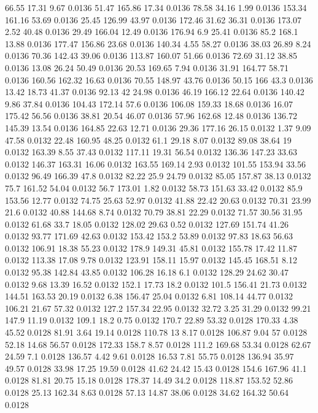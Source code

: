 66.55	17.31	9.67	0.0136
51.47	165.86	17.34	0.0136
78.58	34.16	1.99	0.0136
153.34	161.16	53.69	0.0136
25.45	126.99	43.97	0.0136
172.46	31.62	36.31	0.0136
173.07	2.52	40.48	0.0136
29.49	166.04	12.49	0.0136
176.94	6.9	25.41	0.0136
85.2	168.1	13.88	0.0136
177.47	156.86	23.68	0.0136
140.34	4.55	58.27	0.0136
38.03	26.89	8.24	0.0136
70.36	142.43	39.06	0.0136
113.87	160.07	51.66	0.0136
72.69	31.12	38.85	0.0136
13.08	26.24	50.49	0.0136
20.53	169.65	7.94	0.0136
31.91	164.77	58.71	0.0136
160.56	162.32	16.63	0.0136
70.55	148.97	43.76	0.0136
50.15	166	43.3	0.0136
13.42	18.73	41.37	0.0136
92.13	42	24.98	0.0136
46.19	166.12	22.64	0.0136
140.42	9.86	37.84	0.0136
104.43	172.14	57.6	0.0136
106.08	159.33	18.68	0.0136
16.07	175.42	56.56	0.0136
38.81	20.54	46.07	0.0136
57.96	162.68	12.48	0.0136
136.72	145.39	13.54	0.0136
164.85	22.63	12.71	0.0136
29.36	177.16	26.15	0.0132
1.37	9.09	47.58	0.0132
22.48	160.95	48.25	0.0132
61.1	29.18	8.07	0.0132
89.08	38.64	19	0.0132
163.39	8.55	37.43	0.0132
117.11	19.31	56.54	0.0132
136.36	147.23	33.63	0.0132
146.37	163.31	16.06	0.0132
163.55	169.14	2.93	0.0132
101.55	153.94	33.56	0.0132
96.49	166.39	47.8	0.0132
82.22	25.9	24.79	0.0132
85.05	157.87	38.13	0.0132
75.7	161.52	54.04	0.0132
56.7	173.01	1.82	0.0132
58.73	151.63	33.42	0.0132
85.9	153.56	12.77	0.0132
74.75	25.63	52.97	0.0132
41.88	22.42	20.63	0.0132
70.31	23.99	21.6	0.0132
40.88	144.68	8.74	0.0132
70.79	38.81	22.29	0.0132
71.57	30.56	31.95	0.0132
61.68	33.7	18.05	0.0132
128.02	29.63	0.52	0.0132
127.69	151.74	41.26	0.0132
93.77	171.69	42.63	0.0132
153.42	153.2	53.89	0.0132
97.83	18.63	56.63	0.0132
106.91	18.38	55.23	0.0132
178.9	149.31	45.81	0.0132
155.78	17.42	11.87	0.0132
113.38	17.08	9.78	0.0132
123.91	158.11	15.97	0.0132
145.45	168.51	8.12	0.0132
95.38	142.84	43.85	0.0132
106.28	16.18	6.1	0.0132
128.29	24.62	30.47	0.0132
9.68	13.39	16.52	0.0132
152.1	17.73	18.2	0.0132
101.5	156.41	21.73	0.0132
144.51	163.53	20.19	0.0132
6.38	156.47	25.04	0.0132
6.81	108.14	44.77	0.0132
106.21	21.67	57.32	0.0132
127.2	157.34	22.95	0.0132
32.72	3.25	31.29	0.0132
99.21	147.9	11.19	0.0132
109.1	18.2	0.75	0.0132
170.7	22.89	53.32	0.0128
170.33	4.38	45.52	0.0128
81.91	3.64	19.14	0.0128
110.78	13	8.17	0.0128
106.87	9.04	57	0.0128
52.18	14.68	56.57	0.0128
172.33	158.7	8.57	0.0128
111.2	169.68	53.34	0.0128
62.67	24.59	7.1	0.0128
136.57	4.42	9.61	0.0128
16.53	7.81	55.75	0.0128
136.94	35.97	49.57	0.0128
33.98	17.25	19.59	0.0128
41.62	24.42	15.43	0.0128
154.6	167.96	41.1	0.0128
81.81	20.75	15.18	0.0128
178.37	14.49	34.2	0.0128
118.87	153.52	52.86	0.0128
25.13	162.34	8.63	0.0128
57.13	14.87	38.06	0.0128
34.62	164.32	50.64	0.0128
